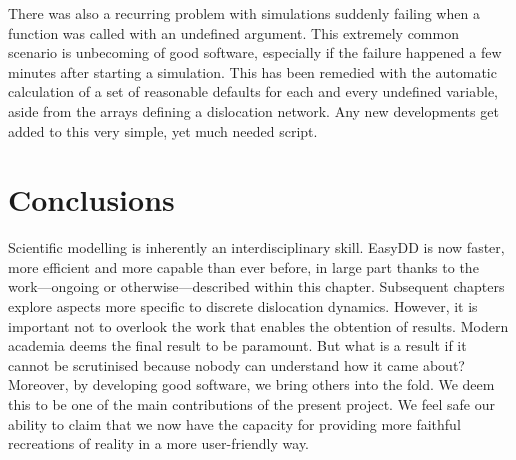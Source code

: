 There was also a recurring problem with simulations suddenly failing when a function was called with an undefined argument. This extremely common scenario is unbecoming of good software, especially if the failure happened a few minutes after starting a simulation. This has been remedied with the automatic calculation of a set of reasonable defaults for each and every undefined variable, aside from the arrays defining a dislocation network. Any new developments get added to this very simple, yet much needed script.

\section{Conclusions}

Scientific modelling is inherently an interdisciplinary skill. EasyDD is now faster, more efficient and more capable than ever before, in large part thanks to the work---ongoing or otherwise---described within this chapter. Subsequent chapters explore aspects more specific to discrete dislocation dynamics. However, it is important not to overlook the work that enables the obtention of results. Modern academia deems the final result to be paramount. But what is a result if it cannot be scrutinised because nobody can understand how it came about? Moreover, by developing good software, we bring others into the fold. We deem this to be one of the main contributions of the present project. We feel safe our ability to claim that we now have the capacity for providing more faithful recreations of reality in a more user-friendly way.
\savearabiccounter
